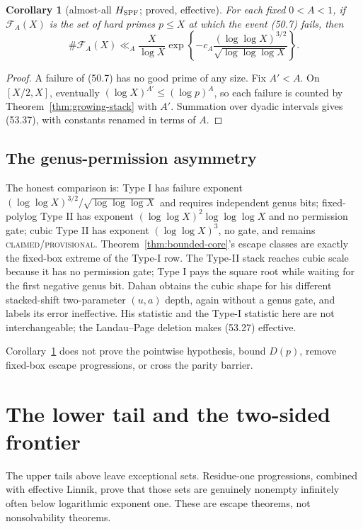 \documentclass[10pt,reqno]{amsart}
\newtheorem{corollary}[theorem]{Corollary}
\theoremstyle{definition}
\newcommand{\1}{\mathbf 1}
\begin{document}
\begin{corollary}[almost-all $H_{\rm SPF}$; proved, effective]
\label{cor:almost-all-SPF}
For each fixed $0<A<1$, if $\mathcal F_A(X)$ is the set of hard primes
$p\leq X$ at which the event (50.7) fails, then
\begin{equation}\tag{53.37}
 \#\mathcal F_A(X)\ll_A\frac X{\log X}
 \exp\left\{-c_A\frac{(\log\log X)^{3/2}}
                         {\sqrt{\log\log\log X}}\right\}.
\end{equation}
\end{corollary}
\begin{proof}
A failure of (50.7) has no good prime of any size.  Fix $A'<A$.  On
$[X/2,X]$, eventually $(\log X)^{A'}\leq(\log p)^A$, so each failure is
counted by Theorem~\ref{thm:growing-stack} with $A'$.  Summation over dyadic
intervals gives (53.37), with constants renamed in terms of $A$.
\end{proof}

\subsection{The genus-permission asymmetry}
The honest comparison is: Type I has failure exponent
$(\log\log X)^{3/2}/\sqrt{\log\log\log X}$ and requires independent genus
bits; fixed-polylog Type II has exponent
$(\log\log X)^2\log\log\log X$ and no permission gate; cubic Type II has
exponent $(\log\log X)^3$, no gate, and remains
\textsc{claimed/provisional}.  Theorem~\ref{thm:bounded-core}'s escape
classes are exactly the fixed-box
extreme of the Type-I row.  The Type-II stack reaches cubic scale because it
has no permission gate; Type I pays the square root while waiting for the
first negative genus bit.  Dahan \cite[Theorem~4.17]{Dahan} obtains the
cubic shape for his different stacked-shift two-parameter $(u,a)$ depth,
again without a genus gate, and labels its error ineffective.  His statistic
and the Type-I statistic here are not interchangeable; the Landau--Page
deletion makes (53.27) effective.

Corollary~\ref{cor:almost-all-SPF} does not prove the pointwise hypothesis,
bound $D(p)$, remove fixed-box escape progressions, or cross the parity
barrier.

\section{The lower tail and the two-sided frontier}\label{sec:lower-tail}
The upper tails above leave exceptional sets.  Residue-one progressions,
combined with effective Linnik, prove that those sets are genuinely nonempty
infinitely often below logarithmic exponent one.  These are escape theorems,
not nonsolvability theorems.
\end{document}
